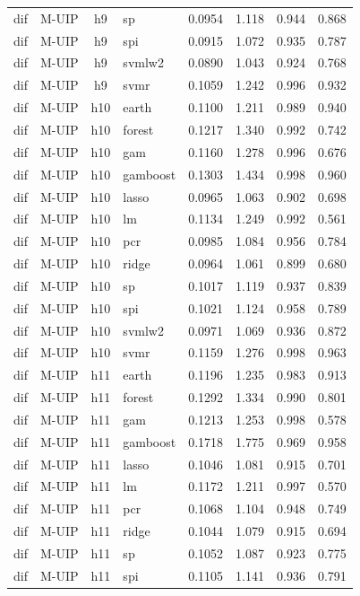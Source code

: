 \begin{ThreePartTable}
\begin{longtable}[t]{llclcccc}
dif & M-UIP & h9 & sp & 0.0954 & 1.118 & 0.944 & 0.868\\
dif & M-UIP & h9 & spi & 0.0915 & 1.072 & 0.935 & 0.787\\
dif & M-UIP & h9 & svmlw2 & 0.0890 & 1.043 & 0.924 & 0.768\\
dif & M-UIP & h9 & svmr & 0.1059 & 1.242 & 0.996 & 0.932\\
\addlinespace
dif & M-UIP & h10 & earth & 0.1100 & 1.211 & 0.989 & 0.940\\
dif & M-UIP & h10 & forest & 0.1217 & 1.340 & 0.992 & 0.742\\
dif & M-UIP & h10 & gam & 0.1160 & 1.278 & 0.996 & 0.676\\
dif & M-UIP & h10 & gamboost & 0.1303 & 1.434 & 0.998 & 0.960\\
dif & M-UIP & h10 & lasso & 0.0965 & 1.063 & 0.902 & 0.698\\
dif & M-UIP & h10 & lm & 0.1134 & 1.249 & 0.992 & 0.561\\
dif & M-UIP & h10 & pcr & 0.0985 & 1.084 & 0.956 & 0.784\\
dif & M-UIP & h10 & ridge & 0.0964 & 1.061 & 0.899 & 0.680\\
dif & M-UIP & h10 & sp & 0.1017 & 1.119 & 0.937 & 0.839\\
dif & M-UIP & h10 & spi & 0.1021 & 1.124 & 0.958 & 0.789\\
dif & M-UIP & h10 & svmlw2 & 0.0971 & 1.069 & 0.936 & 0.872\\
dif & M-UIP & h10 & svmr & 0.1159 & 1.276 & 0.998 & 0.963\\
\addlinespace
dif & M-UIP & h11 & earth & 0.1196 & 1.235 & 0.983 & 0.913\\
dif & M-UIP & h11 & forest & 0.1292 & 1.334 & 0.990 & 0.801\\
dif & M-UIP & h11 & gam & 0.1213 & 1.253 & 0.998 & 0.578\\
dif & M-UIP & h11 & gamboost & 0.1718 & 1.775 & 0.969 & 0.958\\
dif & M-UIP & h11 & lasso & 0.1046 & 1.081 & 0.915 & 0.701\\
dif & M-UIP & h11 & lm & 0.1172 & 1.211 & 0.997 & 0.570\\
dif & M-UIP & h11 & pcr & 0.1068 & 1.104 & 0.948 & 0.749\\
dif & M-UIP & h11 & ridge & 0.1044 & 1.079 & 0.915 & 0.694\\
dif & M-UIP & h11 & sp & 0.1052 & 1.087 & 0.923 & 0.775\\
dif & M-UIP & h11 & spi & 0.1105 & 1.141 & 0.936 & 0.791\\

\end{longtable}
\end{ThreePartTable}
